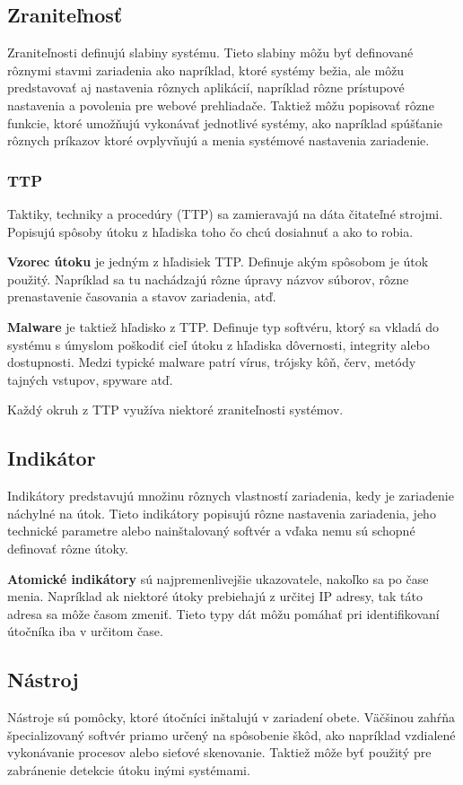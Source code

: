 \documentclass[12pt, a4paper, oneside]{book}
\begin{document}
\subsection{Zraniteľnosť}
Zraniteľnosti definujú slabiny systému. Tieto slabiny môžu byť definované rôznymi stavmi zariadenia ako napríklad, ktoré systémy bežia, ale môžu predstavovať aj nastavenia rôznych aplikácií, napríklad rôzne prístupové nastavenia a povolenia pre webové prehliadače. Taktiež môžu popisovať rôzne funkcie, ktoré umožňujú vykonávať jednotlivé systémy, ako napríklad spúšťanie rôznych príkazov ktoré ovplyvňujú a menia systémové nastavenia zariadenie.

\subsubsection{TTP}
Taktiky, techniky a procedúry (TTP) sa zamieravajú na dáta čitateľné strojmi. Popisujú spôsoby útoku z hľadiska toho čo chcú dosiahnuť a ako to robia.


\textbf{Vzorec útoku} je jedným z hľadisiek TTP. Definuje akým spôsobom je útok použitý. Napríklad sa tu nachádzajú rôzne úpravy názvov súborov, rôzne prenastavenie časovania a stavov zariadenia, atď. 


\textbf{Malware} je taktiež hľadisko z TTP. Definuje typ softvéru, ktorý sa vkladá do systému s úmyslom poškodiť cieľ útoku z hľadiska dôvernosti, integrity alebo dostupnosti. Medzi typické malware patrí vírus, trójsky kôň, červ, metódy tajných vstupov, spyware atď.


Každý okruh z TTP využíva niektoré zraniteľnosti systémov.


\subsection{Indikátor}
Indikátory predstavujú množinu rôznych vlastností zariadenia, kedy je zariadenie náchylné na útok. Tieto indikátory popisujú rôzne nastavenia zariadenia, jeho technické parametre alebo nainštalovaný softvér a vďaka nemu sú schopné definovať rôzne útoky.


\textbf{Atomické indikátory} sú najpremenlivejšie ukazovatele, nakoľko sa po čase menia. Napríklad ak niektoré útoky prebiehajú z určitej IP adresy, tak táto adresa sa môže časom zmeniť. Tieto typy dát môžu pomáhať pri identifikovaní útočníka iba v určitom čase.


\subsection{Nástroj}
Nástroje sú pomôcky, ktoré útočníci inštalujú v zariadení obete. Väčšinou zahŕňa špecializovaný softvér priamo určený na spôsobenie škôd, ako napríklad vzdialené vykonávanie procesov alebo sieťové skenovanie. Taktiež môže byť použitý pre zabránenie detekcie útoku inými systémami.
\end{document}
